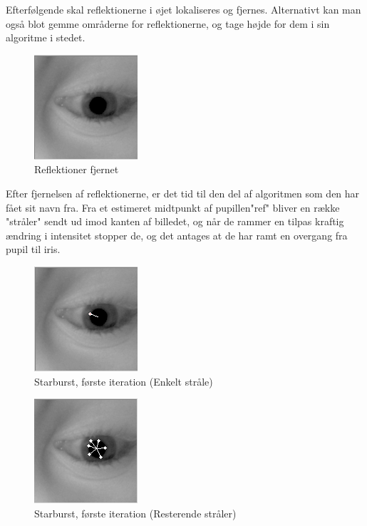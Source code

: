\documentclass[a4paper,oneside,12pt]{article}
\begin{document}
	Efterfølgende skal reflektionerne i øjet lokaliseres og fjernes. Alternativt kan man også blot gemme områderne for reflektionerne, og tage højde for dem i sin algoritme i stedet.
	
	\begin{figure}
	\centering
	\includegraphics[width=0.4\linewidth]{Billeder/CroppedEye,Reflectionremoved.png}
	\caption{Reflektioner fjernet}
	\label{fig:CroppedEye,Reflectionremoved}
	\end{figure}
	
	Efter fjernelsen af reflektionerne, er det tid til den del af algoritmen som den har fået sit navn fra. Fra et estimeret midtpunkt af pupillen"ref" bliver en række "stråler" sendt ud imod kanten af billedet, og når de rammer en tilpas kraftig ændring i intensitet stopper de, og det antages at de har ramt en overgang fra pupil til iris.
		
	\begin{figure}
	\raggedright
	\includegraphics[width=0.4\linewidth]{Billeder/Starburst,Firstsingle.png}
	\caption{Starburst, første iteration (Enkelt stråle)}
	\label{fig:Starburst,Firstsingle}
	\end{figure}	
		
	\begin{figure}
	\raggedleft
	\includegraphics[width=0.4\linewidth]{Billeder/Starburst,First.png}
	\caption{Starburst, første iteration (Resterende stråler)}
	\label{fig:Starburst,First}
	\end{figure}
	
\end{document}
